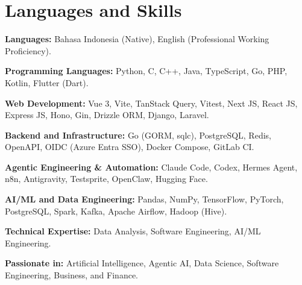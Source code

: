 \section{Languages and Skills}
\begin{cvskills}
  \item \textbf{Languages:} Bahasa Indonesia (Native), English (Professional Working Proficiency).
  \item \textbf{Programming Languages:} Python, C, C++, Java, TypeScript, Go, PHP, Kotlin, Flutter (Dart).
  \item \textbf{Web Development:} Vue 3, Vite, TanStack Query, Vitest, Next JS, React JS, Express JS, Hono, Gin, Drizzle ORM, Django, Laravel.
  \item \textbf{Backend and Infrastructure:} Go (GORM, sqlc), PostgreSQL, Redis, OpenAPI, OIDC (Azure Entra SSO), Docker Compose, GitLab CI.
  \item \textbf{Agentic Engineering \& Automation:} Claude Code, Codex, Hermes Agent, n8n, Antigravity, Testsprite, OpenClaw, Hugging Face.
  \item \textbf{AI/ML and Data Engineering:} Pandas, NumPy, TensorFlow, PyTorch, PostgreSQL, Spark, Kafka, Apache Airflow, Hadoop (Hive).
  \item \textbf{Technical Expertise:} Data Analysis, Software Engineering, AI/ML Engineering.
  \item \textbf{Passionate in:} Artificial Intelligence, Agentic AI, Data Science, Software Engineering, Business, and Finance.
\end{cvskills}
